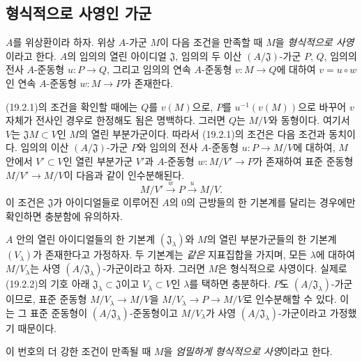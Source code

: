 \subsection{형식적으로 사영인 가군}
\label{subsection:0.19.2-fr}

\begin{definition}[19.2.1]
\label{0.19.2.1-fr}
$A$를 위상환이라 하자. 위상 $A$-가군 $M$이 다음 조건을 만족할 때
$M$을 \emph{형식적으로 사영}이라고 한다. $A$의 임의의 열린 아이디얼
$\mathfrak J$, 임의의 두 이산 $(A/\mathfrak J)$-가군 $P$, $Q$, 임의의
전사 $A$-준동형 $u:P\to Q$, 그리고 임의의 연속 $A$-준동형
$v:M\to Q$에 대하여 $v=u\circ w$인 연속 $A$-준동형 $w:M\to P$가
존재한다.
\end{definition}

\begin{env}[19.2.2]
\label{0.19.2.2-fr}
(19.2.1)의 조건을 확인할 때에는 $Q$를 $v(M)$으로, $P$를
$u^{-1}(v(M))$으로 바꾸어 $v$ 자체가 전사인 경우로 한정해도 됨은
명백하다. 그러면 $Q$는 $M/V$와 동형이다. 여기서 $V$는
$\mathfrak JM\subset V$인 $M$의 열린 부분가군이다. 따라서 (19.2.1)의
조건은 다음 조건과 동치이다. 임의의 이산 $(A/\mathfrak J)$-가군 $P$와
임의의 전사 $A$-준동형 $u:P\to M/V$에 대하여, $M$ 안에서
$V'\subset V$인 열린 부분가군 $V'$과 $A$-준동형 $w:M/V'\to P$가
존재하여 표준 준동형 $M/V'\to M/V$이 다음과 같이 인수분해된다.
\[
  M/V'\xrightarrow{w}P\xrightarrow{u}M/V.
\]
이 조건은 $\mathfrak J$가 아이디얼들로 이루어진 $A$의 $0$의 근방들의
한 기본계를 달리는 경우에만 확인하면 충분함에 유의하자.
\end{env}

\begin{env}[19.2.3]
\label{0.19.2.3-fr}
$A$ 안의 열린 아이디얼들의 한 기본계 $(\mathfrak J_\lambda)$와 $M$의
열린 부분가군들의 한 기본계 $(V_\lambda)$가 존재한다고 가정하자.
두 기본계는 \emph{같은} 지표집합을 가지며, 모든 $\lambda$에 대하여
$M/V_\lambda$는 사영 $(A/\mathfrak J_\lambda)$-가군이라고 하자. 그러면
$M$은 형식적으로 사영이다. 실제로 (19.2.2)의 기호 아래
$\mathfrak J_\lambda\subset\mathfrak J$이고 $V_\lambda\subset V$인
$\lambda$를 택하면 충분하다. $P$도 $(A/\mathfrak J_\lambda)$-가군이므로,
표준 준동형 $M/V_\lambda\to M/V$을
$M/V_\lambda\to P\to M/V$로 인수분해할 수 있다. 이는 그 표준
준동형이 $(A/\mathfrak J_\lambda)$-준동형이고 $M/V_\lambda$가 사영
$(A/\mathfrak J_\lambda)$-가군이라고 가정했기 때문이다.

이 번호의 더 강한 조건이 만족될 때 $M$을 \emph{엄밀하게 형식적으로
사영}이라고 한다.
\end{env}

